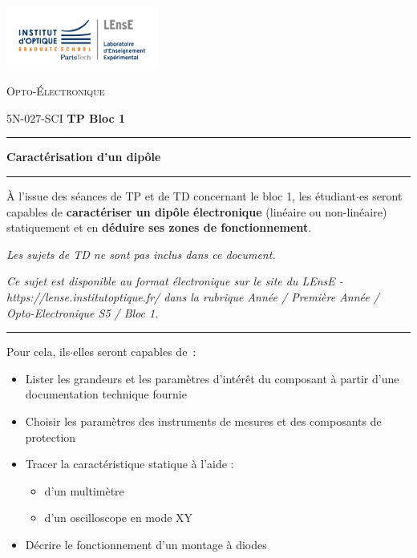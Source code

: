 \documentclass[a4paper,11pt,titlepage]{article} %
\begin{document}
\begin{minipage}[c]{.25\linewidth}
	\includegraphics[width=5cm]{images/Logo-LEnsE.png}
\end{minipage} \hfill
\begin{minipage}[c]{.4\linewidth}

\begin{center}
\vspace{0.3cm}
{\Large \textsc{Opto-Électronique}}

\medskip

5N-027-SCI \qquad \textbf{\Large TP Bloc 1}

\end{center}
\end{minipage}\hfill

\vspace{0.5cm}

\noindent \rule{\linewidth}{1pt}

{\noindent\Large  \rule[-7pt]{0pt}{30pt}%
 \textbf{Caractérisation d'un dipôle}}

\noindent \rule{\linewidth}{1pt}

\bigskip %

{\large À l'issue des séances de TP et de TD concernant le bloc 1, les étudiant$\cdot$es seront capables de \textbf{caractériser un dipôle %
électronique} %
(linéaire ou non-linéaire) statiquement 
et en \textbf{déduire ses zones de fonctionnement}.}

\medskip

\textit{Les sujets de TD ne sont pas inclus dans ce document.}

\medskip

\textit{Ce sujet est disponible au format électronique sur le site du LEnsE - https://lense.institutoptique.fr/ dans la rubrique Année / Première Année / Opto-Electronique S5 / Bloc 1.}

\noindent \rule{\linewidth}{1pt}

\medskip

Pour cela, ils$\cdot$elles %
seront capables de~:

\begin{itemize}
	\item Lister %
	les grandeurs et les %
	paramètres d'intérêt %
	du composant à partir d'une documentation technique fournie
	\item Choisir les paramètres des instruments de mesures et des composants de protection
	\item Tracer la caractéristique statique à l'aide :
	\begin{itemize}
		\item d'un multimètre
		\item d'un oscilloscope en mode XY
	\end{itemize}
	\item Décrire le fonctionnement d'un montage à diodes
\end{itemize}
\end{document}

